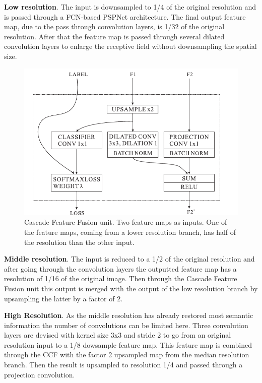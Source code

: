 \documentclass[12pt,a4paper]{article}
\begin{document}
\textbf{Low resolution}. The input is downsampled to 1/4 of the original resolution and is passed through a FCN-based PSPNet architecture. The final output feature map, due to the pass through convolution layers, is 1/32 of the original resolution. After that the feature map is passed through several dilated convolution layers to enlarge the receptive field without downsampling the spatial size.\newline


\begin{figure}
\begin{center}
\includegraphics[scale=0.55]{ccf.png}
\caption{Cascade Feature Fusion unit. Two feature maps as inputs. One of the feature maps, coming from a lower resolution branch, has half of the resolution than the other input.}
\label{ccf}
\end{center}
\end{figure}

\textbf{Middle resolution}. The input is reduced to a 1/2 of the original resolution and after going through the convolution layers the outputted feature map has a resolution of 1/16 of the original image. Then through the Cascade Feature Fusion unit this output is merged with the output of the low resolution branch by upsampling the latter by a factor of 2.\newline

\textbf{High Resolution}. As the middle resolution has already restored most semantic information the number of convolutions can be limited here. Three convolution layers are devised with kernel size 3x3 and stride 2 to go from an original resolution input to a 1/8 dowsample feature map. This feature map is combined through the CCF with the factor 2 upsampled map from the median resolution branch. Then the result is upsampled to resolution 1/4 and passed through a projection convolution.\newline
\end{document}
